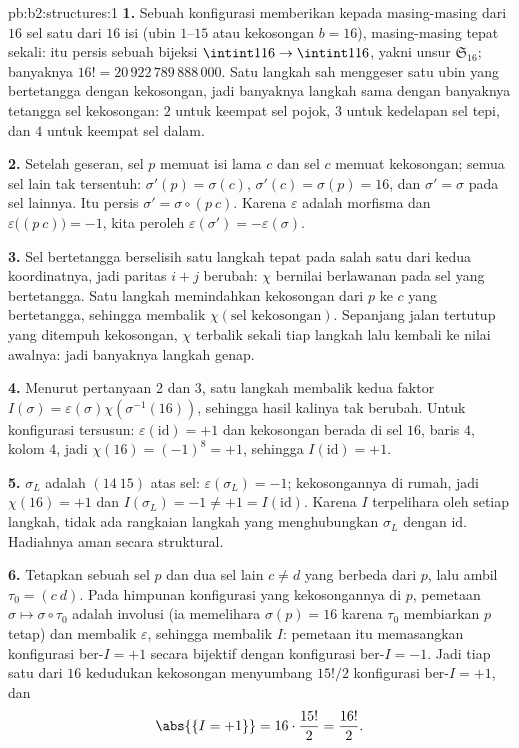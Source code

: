 \begin{solution}{pb:b2:structures:1}
\textbf{1.} Sebuah konfigurasi memberikan kepada masing-masing dari $16$
sel satu dari $16$ isi (ubin $1$--$15$ atau kekosongan $b = 16$),
masing-masing tepat sekali: itu persis sebuah bijeksi $\intint1{16} \to
\intint1{16}$, yakni unsur $\mathfrak{S}_{16}$; banyaknya $16!
= 20\,922\,789\,888\,000$. Satu langkah sah menggeser satu ubin yang
bertetangga dengan kekosongan, jadi banyaknya langkah sama dengan
banyaknya tetangga sel kekosongan: $2$ untuk keempat sel pojok,
$3$ untuk kedelapan sel tepi, dan $4$ untuk keempat sel dalam.

\textbf{2.} Setelah geseran, sel $p$ memuat isi lama
$c$ dan sel $c$ memuat kekosongan; semua sel lain tak tersentuh:
$\sigma'(p) = \sigma(c)$, $\sigma'(c) = \sigma(p) = 16$, dan
$\sigma' = \sigma$ pada sel lainnya. Itu persis $\sigma' = \sigma
\circ (p\ c)$. Karena $\varepsilon$ adalah morfisma dan
$\varepsilon\bigl((p\ c)\bigr) = -1$, kita peroleh
$\varepsilon(\sigma') = -\varepsilon(\sigma)$.

\textbf{3.} Sel bertetangga berselisih satu langkah tepat pada salah
satu dari kedua koordinatnya, jadi paritas $i + j$ berubah: $\chi$
bernilai berlawanan pada sel yang bertetangga. Satu langkah memindahkan
kekosongan dari $p$ ke $c$ yang bertetangga, sehingga membalik
$\chi(\text{sel kekosongan})$. Sepanjang jalan tertutup yang ditempuh
kekosongan, $\chi$ terbalik sekali tiap langkah lalu kembali ke nilai
awalnya: jadi banyaknya langkah genap.

\textbf{4.} Menurut pertanyaan 2 dan 3, satu langkah membalik kedua
faktor $I(\sigma) = \varepsilon(\sigma)\chi(\sigma^{-1}(16))$, sehingga
hasil kalinya tak berubah. Untuk konfigurasi tersusun:
$\varepsilon(\mathrm{id}) = +1$ dan kekosongan berada di sel $16$,
baris $4$, kolom $4$, jadi $\chi(16) = (-1)^{8} = +1$, sehingga
$I(\mathrm{id}) = +1$.

\textbf{5.} $\sigma_L$ adalah  $(14\ 15)$ atas sel:
$\varepsilon(\sigma_L) = -1$; kekosongannya di rumah, jadi $\chi(16) =
+1$ dan $I(\sigma_L) = -1 \neq +1 = I(\mathrm{id})$. Karena $I$
terpelihara oleh setiap langkah, tidak ada rangkaian langkah yang
menghubungkan $\sigma_L$ dengan $\mathrm{id}$. Hadiahnya aman secara struktural.

\textbf{6.} Tetapkan sebuah sel $p$ dan dua sel lain $c \neq d$ yang
berbeda dari $p$, lalu ambil $\tau_0 = (c\ d)$. Pada himpunan
konfigurasi yang kekosongannya di $p$, pemetaan $\sigma \mapsto \sigma
\circ \tau_0$ adalah involusi (ia memelihara $\sigma(p) = 16$
karena $\tau_0$ membiarkan $p$ tetap) dan membalik $\varepsilon$,
sehingga membalik $I$: pemetaan itu memasangkan konfigurasi ber-$I = +1$
secara bijektif dengan konfigurasi ber-$I = -1$. Jadi tiap satu dari $16$
kedudukan kekosongan menyumbang $15!/2$ konfigurasi ber-$I = +1$, dan
\[
\abs{\{I = +1\}} = 16 \cdot \frac{15!}{2} = \frac{16!}{2}.
\]


\end{solution}
